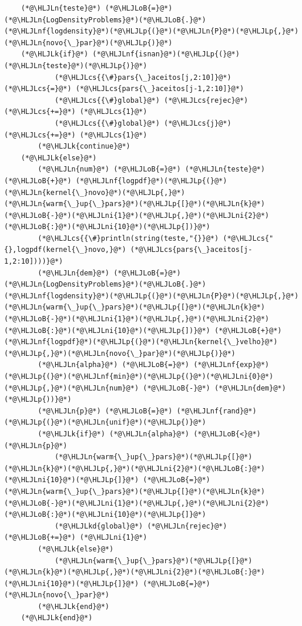 \documentclass[12pt,a4paper]{article}
\newcommand{\HLJLk}[1]{\textcolor[RGB]{148,91,176}{\textbf{#1}}}
\newcommand{\HLJLkd}[1]{\textcolor[RGB]{214,102,97}{\textit{#1}}}
\newcommand{\HLJLn}[1]{#1}
\newcommand{\HLJLnf}[1]{\textcolor[RGB]{66,102,213}{#1}}
\newcommand{\HLJLni}[1]{\textcolor[RGB]{59,151,46}{#1}}
\newcommand{\HLJLoB}[1]{\textcolor[RGB]{102,102,102}{\textbf{#1}}}
\newcommand{\HLJLp}[1]{#1}
\newcommand{\HLJLcs}[1]{\textcolor[RGB]{153,153,119}{\textit{#1}}}
\begin{document}
\begin{lstlisting}
    (*@\HLJLn{teste}@*) (*@\HLJLoB{=}@*) (*@\HLJLn{LogDensityProblems}@*)(*@\HLJLoB{.}@*)(*@\HLJLnf{logdensity}@*)(*@\HLJLp{(}@*)(*@\HLJLn{P}@*)(*@\HLJLp{,}@*)(*@\HLJLn{novo{\_}par}@*)(*@\HLJLp{)}@*)
    (*@\HLJLk{if}@*) (*@\HLJLnf{isnan}@*)(*@\HLJLp{(}@*)(*@\HLJLn{teste}@*)(*@\HLJLp{)}@*)
            (*@\HLJLcs{{\#}pars{\_}aceitos[j,2:10]}@*) (*@\HLJLcs{=}@*) (*@\HLJLcs{pars{\_}aceitos[j-1,2:10]}@*)
            (*@\HLJLcs{{\#}global}@*) (*@\HLJLcs{rejec}@*) (*@\HLJLcs{+=}@*) (*@\HLJLcs{1}@*)
            (*@\HLJLcs{{\#}global}@*) (*@\HLJLcs{j}@*) (*@\HLJLcs{+=}@*) (*@\HLJLcs{1}@*)
        (*@\HLJLk{continue}@*)
    (*@\HLJLk{else}@*)
        (*@\HLJLn{num}@*) (*@\HLJLoB{=}@*) (*@\HLJLn{teste}@*) (*@\HLJLoB{+}@*) (*@\HLJLnf{logpdf}@*)(*@\HLJLp{(}@*)(*@\HLJLn{kernel{\_}novo}@*)(*@\HLJLp{,}@*)(*@\HLJLn{warm{\_}up{\_}pars}@*)(*@\HLJLp{[}@*)(*@\HLJLn{k}@*)(*@\HLJLoB{-}@*)(*@\HLJLni{1}@*)(*@\HLJLp{,}@*)(*@\HLJLni{2}@*)(*@\HLJLoB{:}@*)(*@\HLJLni{10}@*)(*@\HLJLp{])}@*)
        (*@\HLJLcs{{\#}println(string(teste,"{}}@*) (*@\HLJLcs{"{},logpdf(kernel{\_}novo,}@*) (*@\HLJLcs{pars{\_}aceitos[j-1,2:10])))}@*)
        (*@\HLJLn{dem}@*) (*@\HLJLoB{=}@*) (*@\HLJLn{LogDensityProblems}@*)(*@\HLJLoB{.}@*)(*@\HLJLnf{logdensity}@*)(*@\HLJLp{(}@*)(*@\HLJLn{P}@*)(*@\HLJLp{,}@*)(*@\HLJLn{warm{\_}up{\_}pars}@*)(*@\HLJLp{[}@*)(*@\HLJLn{k}@*)(*@\HLJLoB{-}@*)(*@\HLJLni{1}@*)(*@\HLJLp{,}@*)(*@\HLJLni{2}@*)(*@\HLJLoB{:}@*)(*@\HLJLni{10}@*)(*@\HLJLp{])}@*) (*@\HLJLoB{+}@*) (*@\HLJLnf{logpdf}@*)(*@\HLJLp{(}@*)(*@\HLJLn{kernel{\_}velho}@*)(*@\HLJLp{,}@*)(*@\HLJLn{novo{\_}par}@*)(*@\HLJLp{)}@*)
        (*@\HLJLn{alpha}@*) (*@\HLJLoB{=}@*) (*@\HLJLnf{exp}@*)(*@\HLJLp{(}@*)(*@\HLJLnf{min}@*)(*@\HLJLp{(}@*)(*@\HLJLni{0}@*)(*@\HLJLp{,}@*)(*@\HLJLn{num}@*) (*@\HLJLoB{-}@*) (*@\HLJLn{dem}@*)(*@\HLJLp{))}@*)
        (*@\HLJLn{p}@*) (*@\HLJLoB{=}@*) (*@\HLJLnf{rand}@*)(*@\HLJLp{(}@*)(*@\HLJLn{unif}@*)(*@\HLJLp{)}@*)
        (*@\HLJLk{if}@*) (*@\HLJLn{alpha}@*) (*@\HLJLoB{<}@*) (*@\HLJLn{p}@*)
            (*@\HLJLn{warm{\_}up{\_}pars}@*)(*@\HLJLp{[}@*)(*@\HLJLn{k}@*)(*@\HLJLp{,}@*)(*@\HLJLni{2}@*)(*@\HLJLoB{:}@*)(*@\HLJLni{10}@*)(*@\HLJLp{]}@*) (*@\HLJLoB{=}@*) (*@\HLJLn{warm{\_}up{\_}pars}@*)(*@\HLJLp{[}@*)(*@\HLJLn{k}@*)(*@\HLJLoB{-}@*)(*@\HLJLni{1}@*)(*@\HLJLp{,}@*)(*@\HLJLni{2}@*)(*@\HLJLoB{:}@*)(*@\HLJLni{10}@*)(*@\HLJLp{]}@*)
            (*@\HLJLkd{global}@*) (*@\HLJLn{rejec}@*) (*@\HLJLoB{+=}@*) (*@\HLJLni{1}@*)
        (*@\HLJLk{else}@*)
            (*@\HLJLn{warm{\_}up{\_}pars}@*)(*@\HLJLp{[}@*)(*@\HLJLn{k}@*)(*@\HLJLp{,}@*)(*@\HLJLni{2}@*)(*@\HLJLoB{:}@*)(*@\HLJLni{10}@*)(*@\HLJLp{]}@*) (*@\HLJLoB{=}@*) (*@\HLJLn{novo{\_}par}@*)
        (*@\HLJLk{end}@*)
    (*@\HLJLk{end}@*)


\end{lstlisting}
\end{document}
